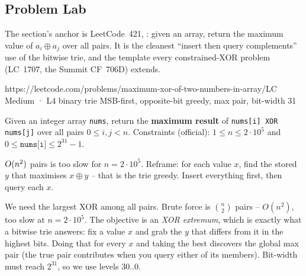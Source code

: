 \subsection{Problem Lab}

The section's anchor is LeetCode~421, : given an array, return the maximum value of
$a_i \oplus a_j$ over all pairs. It is the cleanest ``insert then query complements'' use of the bitwise
trie, and the template every constrained-XOR problem (LC~1707, the Summit CF~706D) extends.

  {https://leetcode.com/problems/maximum-xor-of-two-numbers-in-array/}{LC Medium · L4}
  {binary trie MSB-first, opposite-bit greedy, max pair, bit-width 31}

\begin{problemstatement}
Given an integer array \texttt{nums}, return the \textbf{maximum result} of \texttt{nums[i] XOR nums[j]}
over all pairs $0 \le i, j < n$. Constraints (official): $1 \le n \le 2\cdot 10^{5}$ and
$0 \le \texttt{nums[i]} \le 2^{31} - 1$.
\end{problemstatement}

\begin{attemptgate}
$O(n^2)$ pairs is too slow for $n=2\cdot 10^5$. Reframe: for each value $x$, find the stored $y$ that
maximises $x\oplus y$ -- that is the trie greedy. Insert everything first, then query each $x$.
\end{attemptgate}

We need the largest XOR among all pairs. Brute force is $\binom{n}{2}$ pairs -- $O(n^2)$, too slow at
$n=2\cdot 10^5$. The objective is an \emph{XOR extremum}, which is exactly what a bitwise trie answers:
fix a value $x$ and grab the $y$ that differs from it in the highest bits. Doing that for every $x$ and
taking the best discovers the global max pair (the true pair contributes when you query either of its
members). Bit-width must reach $2^{31}$, so we use levels $30..0$.

